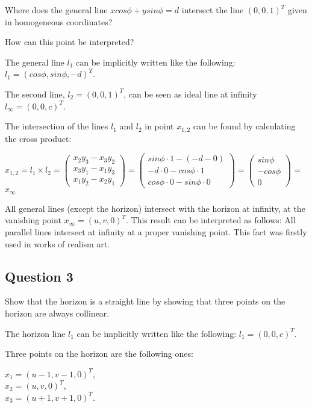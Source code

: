 \documentclass[a4paper,headings=small]{scrartcl}
\numberwithin{equation}{section} %
\numberwithin{figure}{section}   %
\begin{document}
Where does the general line $ x cos \phi + y sin \phi = d$ intersect the line $(0, 0, 1)^T$
given in homogeneous coordinates?

How can this point be interpreted?

The general line $l_1$ can be implicitly written like the following:
$l_1=(cos \phi, sin \phi, -d)^T$.

The second line, $l_{2}=(0, 0, 1)^T$, can be seen as ideal line at infinity $l_{\infty}=(0, 0, c)^T$.

The intersection of the lines $l_1$ and $l_2$ in point $x_{1,2}$ can be found by calculating the cross product:

$x_{1,2} = l_1 \times l_2 =
\left( \begin{array}{c}
x_2 y_3 - x_3 y_2\\
x_3 y_1 - x_1 y_3\\
x_1 y_2 - x_2 y_1\end{array} \right) =
\left( \begin{array}{c}
sin \phi \cdot 1 - (-d - 0)\\
-d \cdot 0 - cos \phi \cdot 1\\
cos \phi \cdot 0 - sin \phi \cdot 0\end{array} \right) =
\left( \begin{array}{c}
sin \phi\\
-cos \phi\\
0\end{array} \right)$ = $x_{\infty}$

All general lines (except the horizon) intersect with the horizon at infinity,
at the vanishing point $x_{\infty}=(u,v,0)^T$.
This result can be interpreted as follows:
All parallel lines intersect at infinity at a proper vanishing point.
This fact was firstly used in works of realism art.

\subsection{Question 3}

Show that the horizon is a straight line by showing that three points
on the horizon are always collinear.

The horizon line $l_1$ can be implicitly written like the following: $l_1=(0, 0, c)^T$.

Three points on the horizon are the following ones:

$x_{1} = (u - 1, v - 1, 0)^T$, \\
$x_{2} = (u, v, 0)^T$, \\
$x_{3} = (u + 1, v + 1, 0)^T$. \\
\end{document}
